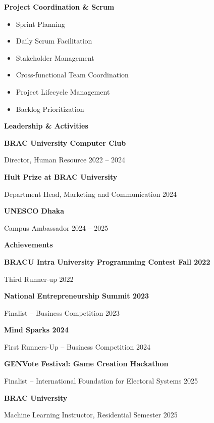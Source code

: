 \documentclass[11pt]{article}
\begin{document}
\textbf{Project Coordination \& Scrum}
\begin{itemize}
    \item Sprint Planning
    \item Daily Scrum Facilitation
    \item Stakeholder Management
    \item Cross-functional Team Coordination
    \item Project Lifecycle Management
    \item Backlog Prioritization
\end{itemize}

\vspace{4pt}

\begin{center}
    \textbf{Leadership \& Activities}
\end{center}

\textbf{BRAC University Computer Club}

Director, Human Resource \hfill 2022 -- 2024

\vspace{3pt}

\textbf{Hult Prize at BRAC University}

Department Head, Marketing and Communication \hfill 2024

\vspace{3pt}

\textbf{UNESCO Dhaka}

Campus Ambassador \hfill 2024 -- 2025

\vspace{4pt}

\begin{center}
    \textbf{Achievements}
\end{center}
\textbf{BRACU Intra University Programming Contest Fall 2022}

Third Runner-up \hfill 2022

\vspace{3pt}

\textbf{National Entrepreneurship Summit 2023}

Finalist -- Business Competition \hfill 2023

\vspace{3pt}

\textbf{Mind Sparks 2024}

First Runners-Up -- Business Competition \hfill 2024

\vspace{3pt}

\textbf{GENVote Festival: Game Creation Hackathon}

Finalist -- International Foundation for Electoral Systems \hfill 2025

\vspace{3pt}

\textbf{BRAC University}

Machine Learning Instructor, Residential Semester \hfill 2025
\end{document}
